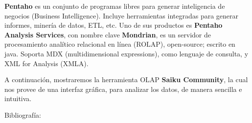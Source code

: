 \documentclass{fancyslides}
\begin{document}
\begin{frame}
\end{frame}

\begin{frame}
\misc
{
\justifying \textbf{Pentaho} es un conjunto de programas libres para generar inteligencia de negocios (Business
Intelligence). Incluye herramientas integradas para generar informes, minería de datos, ETL, etc.
Uno de sus productos es \textbf{Pentaho Analysis Services}, con nombre clave \textbf{Mondrian}, es un servidor de procesamiento analítico relacional en línea (ROLAP), open-source; escrito en java.
Soporta MDX (multidimensional expressions), como lenguaje de consulta, y XML for Analysis (XMLA).


\justifying A continuación, mostraremos la herramienta OLAP \textbf{Saiku Community}, la cual nos provee de una interfaz gráfica, para analizar
los datos, de manera sencilla e intuitiva.

}
\end{frame}



\begin{frame}
\misc
{ Bibliografía:

\printbibliography
}
\end{frame}
\end{document}
